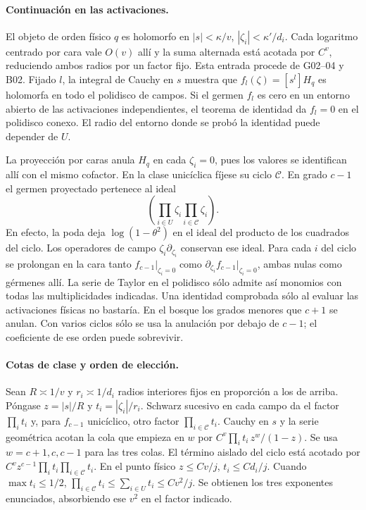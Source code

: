 \paragraph{Continuación en las activaciones.}
El objeto de orden físico $q$ es holomorfo en $|s|<\kappa/v$,
$|\zeta_i|<\kappa'/d_i$. Cada logaritmo centrado por cara vale $O(v)$ allí
y la suma alternada está acotada por $C^v$, reduciendo ambos radios por un factor fijo.
Esta entrada procede de G02--04 y B02. Fijado $l$, la integral de Cauchy en $s$
muestra que $f_l(\zeta)=[s^l]H_q$ es holomorfa en todo el polidisco de campos.
Si el germen $f_l$ es cero en un entorno abierto de las activaciones independientes,
el teorema de identidad da $f_l=0$ en el polidisco conexo.
El radio del entorno donde se probó la identidad puede depender de $U$.

La proyección por caras anula $H_q$ en cada $\zeta_i=0$, pues los valores se identifican
allí con el mismo cofactor. En la clase unicíclica fíjese su ciclo $\mathcal C$.
En grado $c-1$ el germen proyectado pertenece al ideal
\[
 \left(\prod_{i\in U}\zeta_i\prod_{i\in\mathcal C}\zeta_i\right).
\]
En efecto, la poda deja $\log(1-\theta^2)$ en el ideal del producto de los cuadrados del ciclo.
Los operadores de campo $\zeta_i\partial_{\zeta_i}$ conservan ese ideal.
Para cada $i$ del ciclo se prolongan en la cara tanto $f_{c-1}|_{\zeta_i=0}$ como
$\partial_{\zeta_i}f_{c-1}|_{\zeta_i=0}$, ambas nulas como gérmenes allí.
La serie de Taylor en el polidisco sólo admite así monomios con todas las multiplicidades
indicadas. Una identidad comprobada sólo al evaluar las activaciones físicas no bastaría.
En el bosque los grados menores que $c+1$ se anulan. Con varios ciclos sólo se usa
la anulación por debajo de $c-1$; el coeficiente de ese orden puede sobrevivir.

\paragraph{Cotas de clase y orden de elección.}
Sean $R\asymp1/v$ y $r_i\asymp1/d_i$ radios interiores fijos en proporción a los de arriba.
Póngase $z=|s|/R$ y $t_i=|\zeta_i|/r_i$. Schwarz sucesivo en cada campo da el
factor $\prod_i t_i$ y, para $f_{c-1}$ unicíclico, otro factor $\prod_{i\in\mathcal C}t_i$.
Cauchy en $s$ y la serie geométrica acotan la cola que empieza en $w$ por
$C^v\prod_i t_i\, z^w/(1-z)$. Se usa $w=c+1,c,c-1$ para las tres colas.
El término aislado del ciclo está acotado por
$C^v z^{c-1}\prod_i t_i\prod_{i\in\mathcal C}t_i$.
En el punto físico $z\le Cv/j$, $t_i\le C d_i/j$. Cuando $\max t_i\le1/2$,
$\prod_{i\in\mathcal C}t_i\le\sum_{i\in U}t_i\le Cv^2/j$.
Se obtienen los tres exponentes enunciados, absorbiendo ese $v^2$ en el factor indicado.

